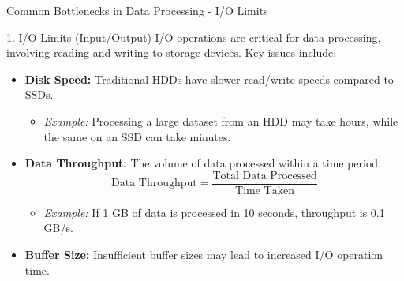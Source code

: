 \documentclass[aspectratio=169]{beamer}
\begin{document}
\begin{frame}[fragile]{Common Bottlenecks in Data Processing - I/O Limits}
    \begin{block}{1. I/O Limits (Input/Output)}
        I/O operations are critical for data processing, involving reading and writing to storage devices. Key issues include:
        \begin{itemize}
            \item \textbf{Disk Speed:} Traditional HDDs have slower read/write speeds compared to SSDs.
            \begin{itemize}
                \item \textit{Example:} Processing a large dataset from an HDD may take hours, while the same on an SSD can take minutes.
            \end{itemize}
            \item \textbf{Data Throughput:} The volume of data processed within a time period.
            \begin{equation}
                \text{Data Throughput} = \frac{\text{Total Data Processed}}{\text{Time Taken}}
            \end{equation}
            \begin{itemize}
                \item \textit{Example:} If 1 GB of data is processed in 10 seconds, throughput is 0.1 GB/s.
            \end{itemize}
            \item \textbf{Buffer Size:} Insufficient buffer sizes may lead to increased I/O operation time.
        \end{itemize}
    \end{block}
\end{frame}
\end{document}
